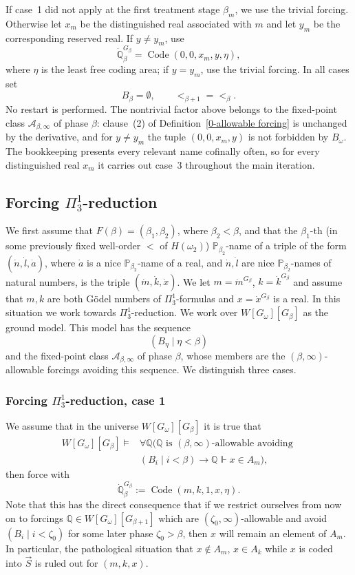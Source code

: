 \documentclass[a4paper,11pt]{article}
\newcommand{\forceP}{\mathbb{P}}
\newcommand{\forceQ}{\mathbb{Q}}
\begin{document}
If case~1 did not apply at the first treatment stage $\beta_m$, we use the trivial forcing. Otherwise let $x_m$ be the distinguished real associated with $m$ and let $y_m$ be the corresponding reserved real. If $y\neq y_m$, use
\[
\dot{\forceQ}_\beta^{G_\beta}=\operatorname{Code}(0,0,x_m,y,\eta),
\]
where $\eta$ is the least free coding area; if $y=y_m$, use the trivial forcing. In all cases set
\[
B_\beta=\emptyset,\qquad <_{\beta+1}=<_\beta.
\]
No restart is performed. The nontrivial factor above belongs to the fixed-point class $\mathcal A_{\beta,\infty}$ of phase $\beta$: clause~(2) of Definition~\ref{0-allowable forcing} is unchanged by the derivative, and for $y\neq y_m$ the tuple $(0,0,x_m,y)$ is not forbidden by $B_\omega$. The bookkeeping presents every relevant name cofinally often, so for every distinguished real $x_m$ it carries out case~3 throughout the main iteration. 

\subsection{Forcing \texorpdfstring{$\Pi^1_3$}{Pi13}-reduction}
We first assume that $F(\beta)=(\beta_1,\beta_2)$, where $\beta_2<\beta$, and that the $\beta_1$-th (in some previously fixed well-order $<$ of $H(\omega_2)$) $\forceP_{\beta_2}$-name of a triple of the form $(\dot n,\dot l,\dot a)$, where $\dot a$ is a nice $\forceP_{\beta_2}$-name of a real, and $\dot n,\dot l$ are nice $\forceP_{\beta_2}$-names of natural numbers, is the triple $(\dot m,\dot k,\dot x)$. We let $m=\dot m^{G_\beta}$, $k=\dot k^{G_\beta}$ and assume that $m,k$ are both G\"odel numbers of $\Pi^1_3$-formulas and $x=\dot x^{G_\beta}$ is a real. In this situation we work towards $\Pi^1_3$-reduction. We work over $W[G_\omega][G_\beta]$ as the ground model.
This model has the sequence
\[
(B_\eta\mid\eta<\beta)
\]
and the fixed-point class $\mathcal A_{\beta,\infty}$ of phase $\beta$, whose members are the $(\beta,\infty)$-allowable forcings avoiding this sequence. We distinguish three cases.

\subsubsection{Forcing \texorpdfstring{$\Pi^1_3$}{Pi13}-reduction, case 1}
We assume that in the universe $W[G_\omega][G_\beta]$ it is true that
\begin{align*}
W[G_\omega][G_\beta]\models&\forall\forceQ\bigl(\forceQ\text{ is }(\beta,\infty)\text{-allowable avoiding }\\
&(B_i\mid i<\beta)\rightarrow\forceQ\Vdash x\in A_m\bigr),
\end{align*}
then force with
\[
\dot{\forceQ}_\beta^{G_\beta}:=\operatorname{Code}(m,k,1,x,\eta).
\]
Note that this has the direct consequence that if we restrict ourselves from now on to forcings $\forceQ\in W[G_\omega][G_{\beta+1}]$ which are $(\zeta_0,\infty)$-allowable and avoid $(B_i\mid i<\zeta_0)$ for some later phase $\zeta_0>\beta$, then $x$ will remain an element of $A_m$. In particular, the pathological situation that $x\notin A_m$, $x\in A_k$ while $x$ is coded into $\vec S$ is ruled out for $(m,k,x)$.
\end{document}
